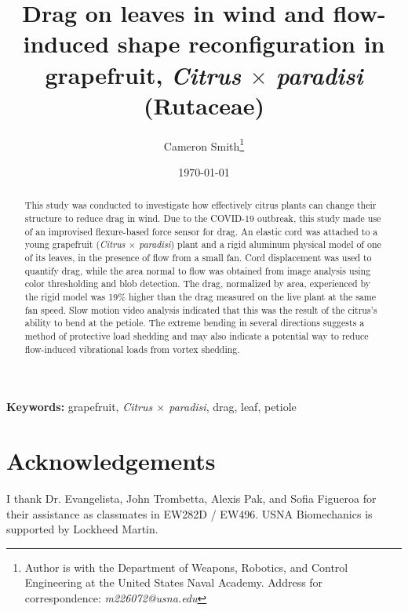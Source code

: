 \documentclass[10pt]{article}
\title{Drag on leaves in wind and flow-induced shape reconfiguration in grapefruit, {\emph{Citrus $\times$ paradisi}} (Rutaceae)}
\author{Cameron Smith\thanks{Author is with the Department of Weapons, Robotics, and Control Engineering at the United States Naval Academy. Address for correspondence: \emph{m226072@usna.edu}}}
\date{\today}
\newcommand{\Citrusxparadisi}{\emph{Citrus $\times$ paradisi}}
\begin{document}
\maketitle
\begin{abstract}
This study was conducted to investigate how effectively citrus plants can change their structure to reduce drag in wind. Due to the COVID-19 outbreak, this study made use of an improvised flexure-based force sensor for drag. An elastic cord was attached to a young grapefruit (\Citrusxparadisi) plant and a rigid aluminum physical model of one of its leaves, in the presence of flow from a small fan.  Cord displacement was used to quantify drag, while the area normal to flow was obtained from image analysis using color thresholding and blob detection. The drag, normalized by area, experienced by the rigid model was 19\% higher than the drag measured on the live plant at the same fan speed. Slow motion video analysis indicated that this was the result of the citrus's ability to bend at the petiole. The extreme bending in several directions suggests a method of protective load shedding and may also indicate a potential way to reduce flow-induced vibrational loads from vortex shedding.
\end{abstract}
{\scriptsize\textbf{Keywords: }grapefruit, \Citrusxparadisi, drag, leaf, petiole}


\section{Acknowledgements}
I thank Dr. Evangelista, John Trombetta, Alexis Pak, and Sofia Figueroa for their assistance as classmates in EW282D / EW496. USNA Biomechanics is supported by Lockheed Martin. 



\clearpage
\appendix
\renewcommand{\figurename}{Supplementary Figure}
\renewcommand{\thefigure}{S\arabic{figure}}

\end{document}
